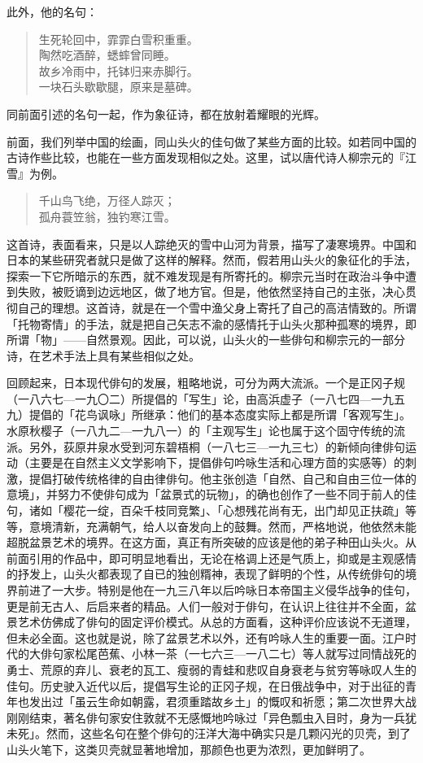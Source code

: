 {    此外，他的名句：
    \begin{quote}
        生死轮回中，霏霏白雪积重重。\\
        陶然吃酒醉，蟋蟀曾同睡。\\
        故乡冷雨中，托钵归来赤脚行。\\
        一块石头歇歇腿，原来是墓碑。
    \end{quote}
    同前面引述的名句一起，作为象征诗，都在放射着耀眼的光辉。

    前面，我们列举中国的绘画，同山头火的佳句做了某些方面的比较。如若同中国的古诗作些比较，也能在一些方面发现相似之处。这里，试以唐代诗人柳宗元的『江雪』为例。

    \begin{quote}
        千山鸟飞绝，万径人踪灭；\\
        孤舟蓑笠翁，独钓寒江雪。
    \end{quote}

    这首诗，表面看来，只是以人踪绝灭的雪中山河为背景，描写了凄寒境界。中国和日本的某些研究者就只是做了这样的解释。然而，假若用山头火的象征化的手法，探索一下它所暗示的东西，就不难发现是有所寄托的。柳宗元当时在政治斗争中遭到失败，被贬谪到边远地区，做了地方官。但是，他依然坚持自己的主张，决心贯彻自己的理想。这首诗，就是在一个雪中渔父身上寄托了自己的高洁情致的。所谓「托物寄情」的手法，就是把自己矢志不渝的感情托于山头火那种孤寒的境界，即所谓「物」——自然景观。因此，可以说，山头火的一些俳句和柳宗元的一部分诗，在艺术手法上具有某些相似之处。

    回顾起来，日本现代俳句的发展，粗略地说，可分为两大流派。一个是正冈子规（一八六七—一九〇二）所提倡的「写生」论，由高浜虚子（一八七四—一九五九）提倡的「花鸟讽咏」所继承：他们的基本态度实际上都是所谓「客观写生」。水原秋樱子（一八九二—一九八一）的「主观写生」论也属于这个固守传统的流派。另外，荻原井泉水受到河东碧梧桐（一八七三—一九三七）的新倾向律俳句运动（主要是在自然主义文学影响下，提倡俳句吟咏生活和心理方茴的实感等）的刺激，提倡打破传统格律的自由律俳句。他主张创造「自然、自己和自由三位一体的意境」，并努力不使俳句成为「盆景式的玩物」，的确也创作了一些不同于前人的佳句，诸如「樱花一绽，百朵千枝同竞繁」、「心想残花尚有无，出门却见正扶疏」等等，意境清新，充满朝气，给人以奋发向上的鼓舞。然而，严格地说，他依然未能超脱盆景艺术的境界。在这方面，真正有所突破的应该是他的弟子种田山头火。从前面引用的作品中，即可明显地看出，无论在格调上还是气质上，抑或是主观感情的抒发上，山头火都表现了自已的独创糈神，表现了鲜明的个性，从传统俳句的境界前进了一大步。特别是他在一九三八年以后吟咏日本帝国主义侵华战争的佳句，更是前无古人、后启来者的精品。人们一般对于俳句，在认识上往往并不全面，盆景艺术仿佛成了俳句的固定评价模式。从总的方面看，这种评价应该说不无道理，但未必全面。这也就是说，除了盆景艺术以外，还有吟咏人生的重要一面。江户时代的大俳句家松尾芭蕉、小林一茶（一七六三—一八二七）等人就写过同情战死的勇士、荒原的弃儿、衰老的瓦工、瘦弱的青蛙和悲叹自身衰老与贫穷等咏叹人生的佳句。历史驶入近代以后，提倡写生论的正冈子规，在日俄战争中，对于出征的青年也发出过「虽云生命如朝露，君须重踏故乡土」的慨叹和祈愿；第二次世界大战刚刚结束，著名俳句家安住敦就不无感慨地吟咏过「异色瓢虫入目时，身为一兵犹未死」。然而，这些名句在整个俳句的汪洋大海中确实只是几颗闪光的贝壳，到了山头火笔下，这类贝壳就显著地增加，那颜色也更为浓烈，更加鲜明了。

}
